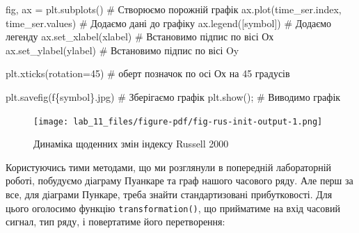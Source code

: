 \documentclass[
  letterpaper,
]{report}
\newenvironment{Shaded}{\begin{snugshade}}{\end{snugshade}}
\newcommand{\CommentTok}[1]{\textcolor[rgb]{0.37,0.37,0.37}{#1}}
\newcommand{\DecValTok}[1]{\textcolor[rgb]{0.68,0.00,0.00}{#1}}
\newcommand{\NormalTok}[1]{\textcolor[rgb]{0.00,0.23,0.31}{#1}}
\newcommand{\OperatorTok}[1]{\textcolor[rgb]{0.37,0.37,0.37}{#1}}
\newcommand{\SpecialCharTok}[1]{\textcolor[rgb]{0.37,0.37,0.37}{#1}}
\newcommand{\SpecialStringTok}[1]{\textcolor[rgb]{0.13,0.47,0.30}{#1}}
\begin{document}
\begin{Shaded}
\begin{Highlighting}[]
\NormalTok{fig, ax }\OperatorTok{=}\NormalTok{ plt.subplots()                   }\CommentTok{\# Створюємо порожній графік}
\NormalTok{ax.plot(time\_ser.index, time\_ser.values)   }\CommentTok{\# Додаємо дані до графіку}
\NormalTok{ax.legend([symbol])                        }\CommentTok{\# Додаємо легенду}
\NormalTok{ax.set\_xlabel(xlabel)                      }\CommentTok{\# Встановимо підпис по вісі Ох}
\NormalTok{ax.set\_ylabel(ylabel)                      }\CommentTok{\# Встановимо підпис по вісі Oy}

\NormalTok{plt.xticks(rotation}\OperatorTok{=}\DecValTok{45}\NormalTok{)                    }\CommentTok{\# оберт позначок по осі Ох на 45 градусів}

\NormalTok{plt.savefig(}\SpecialStringTok{f\textquotesingle{}}\SpecialCharTok{\{}\NormalTok{symbol}\SpecialCharTok{\}}\SpecialStringTok{.jpg\textquotesingle{}}\NormalTok{)               }\CommentTok{\# Зберігаємо графік }
\NormalTok{plt.show()}\OperatorTok{;}                                \CommentTok{\# Виводимо графік}
\end{Highlighting}
\end{Shaded}

\begin{figure}[H]

{\centering \texttt{[image: lab\_11\_files/figure-pdf/fig-rus-init-output-1.png]}

}

\caption{\label{fig-rus-init}Динаміка щоденних змін індексу Russell
2000}

\end{figure}

Користуючись тими методами, що ми розглянули в попередній лабораторній
роботі, побудуємо діаграму Пуанкаре та граф нашого часового ряду. Але
перш за все, для діаграми Пункаре, треба знайти стандартизовані
прибутковості. Для цього оголосимо функцію \texttt{transformation()}, що
прийматиме на вхід часовий сигнал, тип ряду, і повертатиме його
перетворення:
\end{document}
